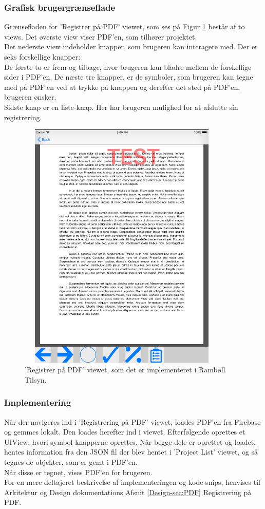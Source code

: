 \subsubsection{Grafisk brugergrænseflade}
Grænsefladen for 'Registrer på PDF' viewet, som ses på Figur \ref{fig:RegistrerObjekterView} består af to views. 
Det øverste view viser PDF'en, som tilhører projektet. \\
Det nederste view indeholder knapper, som brugeren kan interagere med. Der er seks forskellige knapper: \\
De første to er frem og tilbage, hvor brugeren kan bladre mellem de forskellige sider i PDF'en. De næste tre knapper, er de symboler, som brugeren kan tegne med på PDF'en ved at trykke på knappen og derefter det sted på PDF'en, brugeren ønsker. \\
Sidste knap er en liste-knap. Her har brugeren mulighed for at afslutte sin registrering.
\begin{figure}[H] %
	\centering
	\includegraphics[height=12cm, width=10cm]{Design/Applikation/RegistrePDF/PDF}
	\caption{'Registrer på PDF' viewet, som det er implementeret i Rambøll Tilsyn.}
	\label{fig:RegistrerObjekterView}
\end{figure}

\subsubsection{Implementering}
Når der navigeres ind i 'Registrering på PDF' viewet, loades PDF'en fra Firebase og gemmes lokalt. Den loades herefter ind i viewet. Efterfølgende oprettes et UIView, hvori symbol-knapperne oprettes. Når begge dele er oprettet og loadet, hentes information fra den JSON fil der blev hentet i 'Project List' viewet, og så tegnes de objekter, som er gemt i PDF'en. \\
Når disse er tegnet, vises PDF'en for brugeren. \\
For en mere deltajeret beskrivelse af implementeringen og kode snips, henvises til Arkitektur og Design dokumentations Afsnit \ref{Design-sec:PDF} Registrering på PDF.


\clearpage